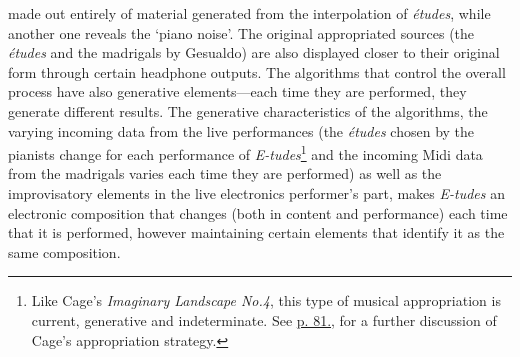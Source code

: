 made out entirely of material generated from the interpolation of \emph{\'{e}tudes}, while another one reveals the `piano noise'. The original appropriated sources (the \emph{\'{e}tudes} and the madrigals by Gesualdo) are also displayed closer to their original form through certain headphone outputs. The algorithms that control the overall process have also generative elements---each time they are performed, they generate different results. The generative characteristics of the algorithms, the varying incoming data from the live performances (the \emph{\'{e}tudes} chosen by the pianists change for each performance of \emph{E-tudes}\footnote{Like Cage's \emph{Imaginary Landscape No.4}, this type of musical appropriation is current, generative and indeterminate. See \hyperlink{landscape4}{p. 81.}, for a further discussion of Cage's appropriation strategy.} and the incoming Midi data from the madrigals varies each time they are performed) as well as the improvisatory elements in the live electronics performer's part, makes \emph{E-tudes} an electronic composition that changes (both in content and performance) each time that it is performed, however maintaining certain elements that identify it as the same composition.

